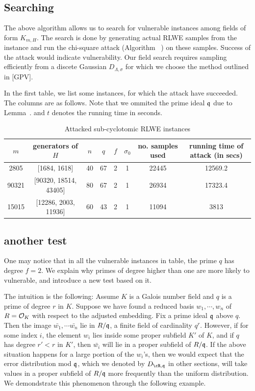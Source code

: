 \documentclass{amsart}
\begin{document}
\subsection{Searching}

The above algorithm allows us to search for vulnerable instances among fields of form $K_{m,H}$. The search is done by generating actual RLWE samples from the instance and run the chi-square attack (Algorithm ~) on these samples. Success of the attack would indicate vulnerability. Our field search requires sampling efficiently from a discete Gaussian $D_{\Lambda, \sigma}$ for which we choose the method outlined in [GPV].

In the first table, we list some instances, for which the attack have succeeded. The columns are as follows. Note that we ommited the prime ideal $\mathfrak{q}$ due to Lemma~.  and $t$ denotes the running time in seconds.

\begin{table}[H]
\caption{Attacked sub-cyclotomic RLWE instances}
\begin{tabular}{c|c|c|c|c|c|c|c}
$m$ & generators of $H$ & $n$ & $q$ & $f$ & $\sigma_0$ & no. samples used & running time of attack (in secs) \\ \hline
2805 &  [1684, 1618] & 40 & 67 & 2 & 1 & 22445 & 12569.2 \\
90321 & [90320, 18514, 43405] & 80 & 67 & 2 & 1 & 26934 & 17323.4 \\
15015 & [12286, 2003, 11936] & 60 & 43 & 2 & 1 & 11094 & 3813
\end{tabular}
\end{table}


\subsection{another test}

One may notice that in all the vulnerable instances in table, the prime $q$ has degree $f = 2$. We explain why primes of degree higher than one are more likely to vulnerable, and introduce a new test based on it.

The intuition is the following: Assume $K$ is a Galois number field and $q$ is a prime of degree $r$ in $K$. Suppose we have found a reduced basis $w_1,\cdots, w_n$ of $R = \mathcal{O}_K$ with respect to the adjusted embedding. Fix a prime ideal $\mathfrak{q}$ above $q$. Then the image $\bar{w_1}, \cdots \bar{w_n}$ lie in $R/\mathfrak{q}$, a finite field of cardinality $q^r$. However, if for some index $i$, the element $w_i$ lies inside some proper subfield $K'$ of $K$, and if $q$ has degree $r' < r$ in $K'$, then  $\bar{w_i}$ will lie in a proper subfield of $R/\mathfrak{q}$. If the above situation happens for a large portion of the $w_i$'s, then we would expect that the error distribution mod $\mathfrak{q}$, which we denoted by $D_{\cR,\fq}$ in other sections, will take values in a proper subfield of $R/\mathfrak{q}$ more frequently than the uniform distribution. We demondstrate this phenomenon through the following example.
\end{document}
